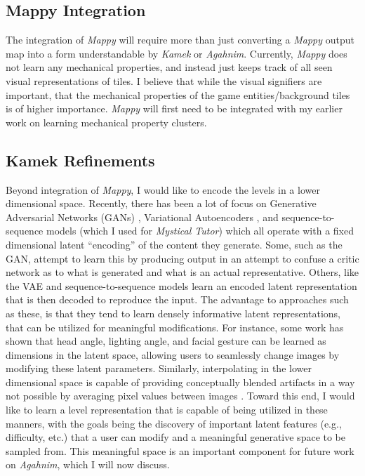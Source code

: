 \documentclass[12pt]{report}
\begin{document}
\subsection*{Mappy Integration}


The integration of \textit{Mappy} will require more than just converting a \textit{Mappy} output map into a form understandable by \textit{Kamek} or \textit{Agahnim}.  Currently, \textit{Mappy} does not learn any mechanical properties, and instead just keeps track of all seen visual representations of tiles.  I believe that while the visual signifiers are important, that the mechanical properties of the game entities/background tiles is of higher importance. \textit{Mappy} will first need to be integrated with my earlier work on learning mechanical property clusters.

\subsection*{Kamek Refinements}

Beyond integration of \textit{Mappy}, 
I would like to encode the levels in a lower dimensional space.  Recently, there has been a lot of focus on Generative Adversarial Networks (GANs) \cite{gans}, Variational Autoencoders \cite{vae}, and sequence-to-sequence models \cite{seq2seq} (which I used for \textit{Mystical Tutor}) which all operate with a fixed dimensional latent ``encoding'' of the content they generate.  Some, such as the GAN, attempt to learn this by producing output in an attempt to confuse a critic network as to what is generated and what is an actual representative. Others, like the VAE and sequence-to-sequence models learn an encoded latent representation that is then decoded to reproduce the input.  The advantage to approaches such as these, is that they tend to learn densely informative latent representations, that can be utilized for meaningful modifications.  For instance, some work has shown that head angle, lighting angle, and facial gesture \cite{ganstuff} can be learned as dimensions in the latent space, allowing users to seamlessly change images by modifying these latent parameters.  Similarly, interpolating in the lower dimensional space is capable of providing conceptually blended artifacts in a way not possible by averaging pixel values between images \cite{ganinterpolation}.  Toward this end, I would like to learn a level representation that is capable of being utilized in these manners, with the goals being the discovery of important latent features (e.g., difficulty, etc.) that a user can modify and a meaningful generative space to be sampled from.  This meaningful space is an important component for future work on \textit{Agahnim}, which I will now discuss.
\end{document}
